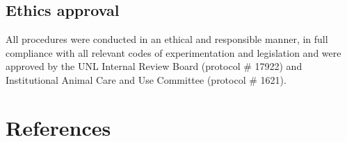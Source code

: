 \documentclass[
  ,doc,floatsintext]{apa6}
\begin{document}
\hypertarget{ethics-approval}{%
\subsection{Ethics approval}\label{ethics-approval}}

All procedures were conducted in an ethical and responsible manner, in full compliance with all relevant codes of experimentation and legislation and were approved by the UNL Internal Review Board (protocol \# 17922) and Institutional Animal Care and Use Committee (protocol \# 1621).

\newpage

\hypertarget{references}{%
\section{References}\label{references}}
\end{document}
